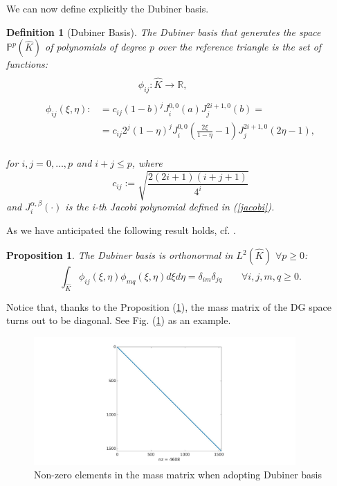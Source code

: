 \documentclass[a4paper,11pt]{article}
\newtheorem{definition}{Definition}
\newtheorem{prop}{Proposition}
\begin{document}
    \noindent We can now define explicitly the Dubiner basis.
    \begin{definition}[Dubiner Basis] \label{dubiner}
    The Dubiner basis that generates the space $\mathbb{P}^p(\hat{K})$ of polynomials of degree $p$ over the reference triangle is the set of functions:
    \begin{equation*}
    \begin{split}
    \\
    & \quad \quad\quad  \quad \phi_{ij}: \hat{K} \rightarrow \mathbb{R}, \\ \\
    \phi_{ij}(\xi,\eta) :&= c_{ij}(1-b)^j J_i^{0,0}(a) J_j^{2i+1,0}(b)=
    \\&=c_{ij} 2^j (1-\eta)^j J_i^{0,0}(\frac{2\xi}{1-\eta}-1) J_j^{2i+1,0} (2\eta-1),
    \end{split}
    \end{equation*}
    \vspace{3mm} \\
    for $i,j=0,\dots,p$ and $i+j \le p$, where
    \begin{equation*}
    c_{ij} := \sqrt{\frac{2(2i+1)(i+j+1)}{4^i}}
    \end{equation*}
    and $J_i^{\alpha,\beta}(\cdot)$ is the i-th Jacobi polynomial defined in (\ref{jacobi}).
    \end{definition}
    
    \vspace{5mm}
    \noindent As we have anticipated the following result holds, cf.  \cite{sherwin}.
    \begin{prop}\label{l2_ortho}
    The Dubiner basis is orthonormal in $L^2(\hat{K})$ $\forall p \geq 0$:
    \begin{equation*}
    \int_{\hat{K}}{\phi_{ij}(\xi,\eta)\phi_{mq}(\xi,\eta) d\xi d\eta}=\delta_{im}\delta_{jq} \qquad \forall i,j,m,q \geq 0.
    \end{equation*}
    \end{prop}
    \vspace{4mm}
    \noindent Notice that, thanks to the Proposition (\ref{l2_ortho}), the mass matrix of the DG space turns out to be diagonal. See Fig. (\ref{mass}) as an example.
    
    \begin{figure}[ht]
    \begin{center}
    \includegraphics[width = 10cm]{./mass_dubiner.jpg}
    	\caption{Non-zero elements in the mass matrix when adopting Dubiner basis}
    	\label{mass}
    \end{center}
    \end{figure}
\end{document}
